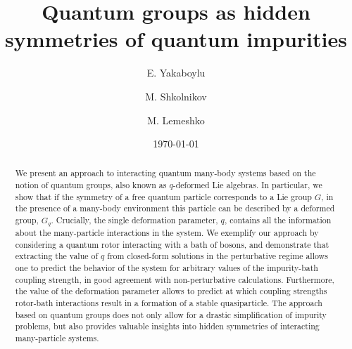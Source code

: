 \documentclass[aps,prl,reprint,showpacs,floatfix]{revtex4-1}
\begin{document}



\title{Quantum groups as hidden symmetries of quantum impurities}


\author{E. Yakaboylu}
\author{M. Shkolnikov}
\author{M. Lemeshko}



\date{\today}




\begin{abstract}

We present an approach to interacting quantum many-body systems based on the notion of quantum groups, also known as $q$-deformed Lie algebras. In particular, we show that if the symmetry of a free quantum particle corresponds to a Lie group $G$, in the presence of a  many-body environment this particle can be described by a deformed group, $G_q$. Crucially, the single deformation parameter, $q$, contains all the information about the many-particle interactions in the system. We exemplify our approach by considering a quantum rotor interacting with a bath of bosons, and demonstrate that extracting the value of $q$ from closed-form solutions in the perturbative regime allows one to predict the behavior of the system for arbitrary values of the impurity-bath coupling strength, in good agreement with non-perturbative calculations. Furthermore, the value of the deformation parameter allows to predict at which coupling strengths rotor-bath interactions result in a formation of a stable quasiparticle. The approach based on quantum groups does not only allow for a drastic simplification of impurity problems, but also provides valuable insights into hidden symmetries of interacting many-particle systems.


\end{abstract}

\maketitle
\end{document}
